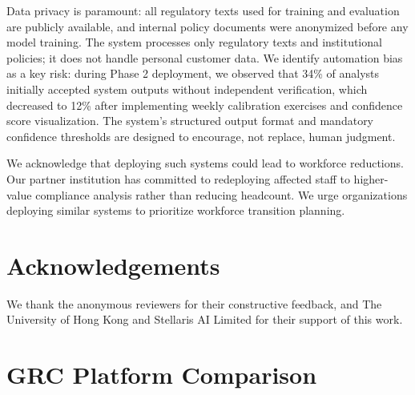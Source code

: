 \documentclass[11pt]{article}
\begin{document}
Data privacy is paramount: all regulatory texts used for training and evaluation are publicly available, and internal policy documents were anonymized before any model training. The system processes only regulatory texts and institutional policies; it does not handle personal customer data. We identify automation bias as a key risk: during Phase 2 deployment, we observed that 34\% of analysts initially accepted system outputs without independent verification, which decreased to 12\% after implementing weekly calibration exercises and confidence score visualization. The system's structured output format and mandatory confidence thresholds are designed to encourage, not replace, human judgment.

We acknowledge that deploying such systems could lead to workforce reductions. Our partner institution has committed to redeploying affected staff to higher-value compliance analysis rather than reducing headcount. We urge organizations deploying similar systems to prioritize workforce transition planning.


\section*{Acknowledgements}

We thank the anonymous reviewers for their constructive feedback, and The University of Hong Kong and Stellaris AI Limited for their support of this work.





\appendix

\section{GRC Platform Comparison}
\label{app:grc}
\end{document}
